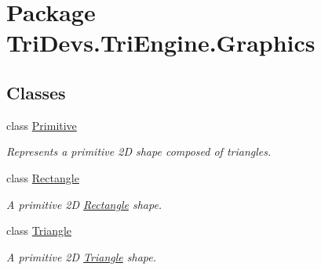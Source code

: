 \hypertarget{namespace_tri_devs_1_1_tri_engine_1_1_graphics}{\section{Package Tri\-Devs.\-Tri\-Engine.\-Graphics}
\label{namespace_tri_devs_1_1_tri_engine_1_1_graphics}
}
\subsection*{Classes}
\begin{DoxyCompactItemize}
\item 
class \hyperlink{class_tri_devs_1_1_tri_engine_1_1_graphics_1_1_primitive}{Primitive}
\begin{DoxyCompactList}\small\item\em Represents a primitive 2\-D shape composed of triangles. \end{DoxyCompactList}\item 
class \hyperlink{class_tri_devs_1_1_tri_engine_1_1_graphics_1_1_rectangle}{Rectangle}
\begin{DoxyCompactList}\small\item\em A primitive 2\-D \hyperlink{class_tri_devs_1_1_tri_engine_1_1_graphics_1_1_rectangle}{Rectangle} shape. \end{DoxyCompactList}\item 
class \hyperlink{class_tri_devs_1_1_tri_engine_1_1_graphics_1_1_triangle}{Triangle}
\begin{DoxyCompactList}\small\item\em A primitive 2\-D \hyperlink{class_tri_devs_1_1_tri_engine_1_1_graphics_1_1_triangle}{Triangle} shape. \end{DoxyCompactList}\end{DoxyCompactItemize}
